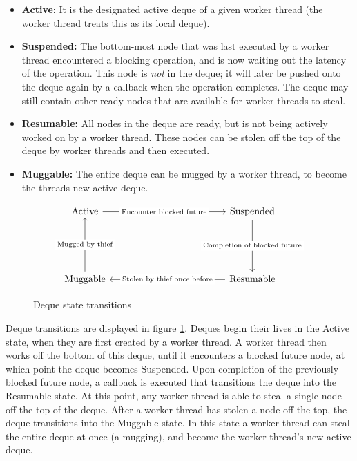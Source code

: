 \documentclass[bsc,frontabs,singlespacing,parskip,deptreport,normalheadings]{infthesis}
\begin{document}
\begin{itemize}
    \item \textbf{Active}: It is the designated active deque of a given worker
        thread (the worker thread treats this as its local deque).
    \item \textbf{Suspended:} The bottom-most node that was last executed by a
        worker thread encountered a blocking operation, and is now waiting out
        the latency of the operation. This node is \textit{not} in the deque; it
        will later be pushed onto the deque again by a callback when the
        operation completes. The deque may still contain other ready nodes that
        are available for worker threads to steal.
    \item \textbf{Resumable:} All nodes in the deque are ready, but is not being
        actively worked on by a worker thread. These nodes can be stolen off the
        top of the deque by worker threads and then executed.
    \item \textbf{Muggable:} The entire deque can be mugged by a worker thread,
        to become the threads new active deque.
\end{itemize}

\begin{figure}[ht]
\[\begin{tikzcd}
	{\text{Active}} &&&&& {\text{Suspended}} \\
	\\
	\\
	{\text{Muggable}} &&&&& {\text{Resumable}}
	\arrow["{\text{Encounter blocked future}}"{description}, from=1-1, to=1-6]
	\arrow["{\text{Completion of blocked future}}"{description}, from=1-6, to=4-6]
	\arrow["{\text{Stolen by thief once before}}"{description}, from=4-6, to=4-1]
	\arrow["{\text{Mugged by thief}}"{description}, from=4-1, to=1-1]
\end{tikzcd}\]
\caption{Deque state transitions}
\label{figure:deque_state_transitions}
\end{figure}

Deque transitions are displayed in figure \ref{figure:deque_state_transitions}.
Deques begin their lives in the Active state, when they are first created by a
worker thread. A worker thread then works off the bottom of this deque, until it
encounters a blocked future node, at which point the deque becomes Suspended.
Upon completion of the previously blocked future node, a callback is executed
that transitions the deque into the Resumable state. At this point, any worker
thread is able to steal a single node off the top of the deque. After a worker
thread has stolen a node off the top, the deque transitions into the Muggable
state. In this state a worker thread can steal the entire deque at once (a
mugging), and become the worker thread's new active deque.
\end{document}
